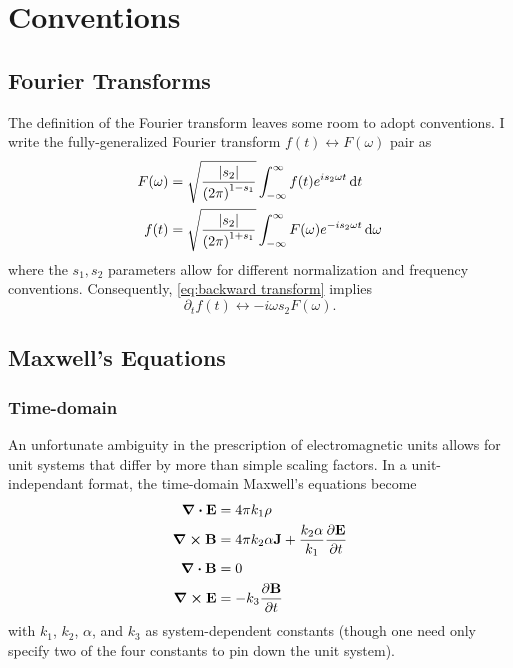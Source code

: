 \chapter{Conventions}

\section{Fourier Transforms\label{sec:general transform}}

The definition of the Fourier transform leaves some room to adopt conventions.
I write the fully-generalized Fourier transform $f(t) \leftrightarrow F(\omega)$ pair as
\begin{subequations}
  \begin{align}
    F(\omega) &= \sqrt{\frac{\abs{s_2}}{\qty(2\pi)^{1-s_1}}} \int_{-\infty}^{\infty} f(t) e^{i s_2 \omega t} \dd{t} \label{eq:forward transform} \\
    f(t) &= \sqrt{\frac{\abs{s_2}}{\qty(2\pi)^{1+s_1}}} \int_{-\infty}^{\infty} F(\omega) e^{- i s_2 \omega t} \dd{\omega} \label{eq:backward transform}
  \end{align}
\end{subequations}
where the $s_1, s_2$ parameters allow for different normalization and frequency conventions. 
Consequently, \cref{eq:backward transform} implies
\begin{equation}
  \partial_t f(t) \leftrightarrow -i \omega s_2 F(\omega).
\end{equation}

\section{Maxwell's Equations}

\subsection{Time-domain}
An unfortunate ambiguity in the prescription of electromagnetic units allows for unit systems that differ by more than simple scaling factors.
In a unit-independant format, the time-domain Maxwell's equations become
\begin{subequations}
  \begin{align}
    \div{\vb{E}} &= 4 \pi k_1 \rho \label{eq:gauss} \\
    \curl{\vb{B}} &= 4 \pi k_2 \alpha \vb{J} + \frac{k_2 \alpha}{k_1} \pdv{\vb{E}}{t} \label{eq:ampere}\\
    \div{\vb{B}} &= 0 \label{eq:no monopoles} \\
    \curl{\vb{E}} &= - k_3 \pdv{\vb{B}}{t} \label{eq:faraday}
  \end{align}
  \label{eq:time-domain maxwell equations}
\end{subequations}
with $k_1$, $k_2$, $\alpha$, and $k_3$ as system-dependent constants (though one need only specify two of the four constants to pin down the unit system).

